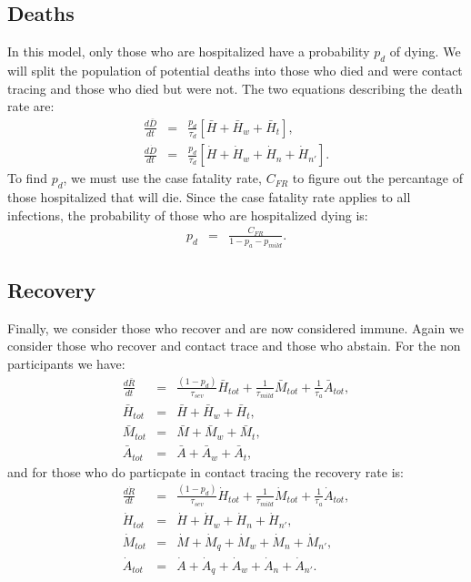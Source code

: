 \documentclass[notitlepage, superscriptaddress]{revtex4-2}
\begin{document}
\subsection{Deaths}
In this model, only those who are hospitalized have a probability $p_{d}$ of dying. We will split the population of potential deaths into those who died and were contact tracing and those who died but were not. The two equations describing the death rate are:
\begin{eqnarray}
\frac{d\bar{D}}{dt} &=& \frac{p_{d}}{\tau_{d}} \left[ \bar{H} + \bar{H}_{w} + \bar{H}_{t}   \right], \\ 
\frac{d\dot{D}}{dt} &=& \frac{p_{d}}{\tau_{d}} \left[ \dot{H} + \dot{H}_{w} + \dot{H}_{n} + \dot{H}_{n'}   \right].
\end{eqnarray}
To find $p_{d}$, we must use the case fatality rate, $C_{FR}$ to figure out the percantage of those hospitalized that will die. Since the case fatality rate applies to all infections, the probability of those who are hospitalized dying is:
\begin{eqnarray}
p_{d} &=& \frac{C_{FR}}{1- p_{a} - p_{mild}}.
\end{eqnarray}

\subsection{Recovery}
Finally, we consider those who recover and are now considered immune. Again we consider those who recover and contact trace and those who abstain. For the non participants we have:
\begin{eqnarray}
\frac{d\bar{R}}{dt} &=& \frac{(1 - p_{d})}{\tau_{sev}} \bar{H}_{tot} + \frac{1}{\tau_{mild}} \bar{M}_{tot} + \frac{1}{\tau_{a}} \bar{A}_{tot}, \\
\bar{H}_{tot} &=&  \bar{H} + \bar{H}_{w} + \bar{H}_{t} , \\
\bar{M}_{tot} &=&  \bar{M} + \bar{M}_{w} + \bar{M}_{t}, \\
\bar{A}_{tot} &=&  \bar{A} + \bar{A}_{w} + \bar{A}_{t},  
\end{eqnarray}
and for those who do particpate in contact tracing the recovery rate is:
\begin{eqnarray}
\frac{d\dot{R}}{dt} &=& \frac{(1 - p_{d})}{\tau_{sev}} \dot{H}_{tot} + \frac{1}{\tau_{mild}} \dot{M}_{tot} + \frac{1}{\tau_{a}} \dot{A}_{tot}, \\
\dot{H}_{tot} &=&  \dot{H} + \dot{H}_{w} + \dot{H}_{n} + \dot{H}_{n'} , \\
\dot{M}_{tot} &=&  \dot{M} + \dot{M}_{q} + \dot{M}_{w} + \dot{M}_{n} + \dot{M}_{n'}, \\
\dot{A}_{tot} &=&  \dot{A} + \dot{A}_{q} + \dot{A}_{w} + \dot{A}_{n} + \dot{A}_{n'}. 
\end{eqnarray}
\end{document}
